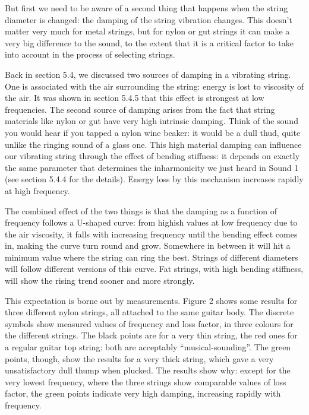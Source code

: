   But first we need to be aware of a second thing that happens when the string 
  diameter is changed: the damping of the string vibration changes. This 
  doesn't matter very much for metal strings, but for nylon or gut strings it 
  can make a very big difference to the sound, to the extent that it is a 
  critical factor to take into account in the process of selecting strings. 

  Back in section 5.4, we discussed two sources of damping in a vibrating 
  string. One is associated with the air surrounding the string: energy is lost 
  to viscosity of the air. It was shown in section 5.4.5 that this effect is 
  strongest at low frequencies. The second source of damping arises from the 
  fact that string materials like nylon or gut have very high intrinsic 
  damping. Think of the sound you would hear if you tapped a nylon wine beaker: 
  it would be a dull thud, quite unlike the ringing sound of a glass one. This 
  high material damping can influence our vibrating string through the effect 
  of bending stiffness: it depends on exactly the same parameter that 
  determines the inharmonicity we just heard in Sound 1 (see section 5.4.4 for 
  the details). Energy loss by this mechanism increases rapidly at high 
  frequency. 

  The combined effect of the two things is that the damping as a function of 
  frequency follows a U-shaped curve: from highish values at low frequency due 
  to the air viscosity, it falls with increasing frequency until the bending 
  effect comes in, making the curve turn round and grow. Somewhere in between 
  it will hit a minimum value where the string can ring the best. Strings of 
  different diameters will follow different versions of this curve. Fat 
  strings, with high bending stiffness, will show the rising trend sooner and 
  more strongly. 

  This expectation is borne out by measurements. Figure 2 shows some results 
  for three different nylon strings, all attached to the same guitar body. The 
  discrete symbols show measured values of frequency and loss factor, in three 
  colours for the different strings. The black points are for a very thin 
  string, the red ones for a regular guitar top string: both are acceptably 
  ``musical-sounding''. The green points, though, show the results for a very 
  thick string, which gave a very unsatisfactory dull thump when plucked. The 
  results show why: except for the very lowest frequency, where the three 
  strings show comparable values of loss factor, the green points indicate very 
  high damping, increasing rapidly with frequency. 

